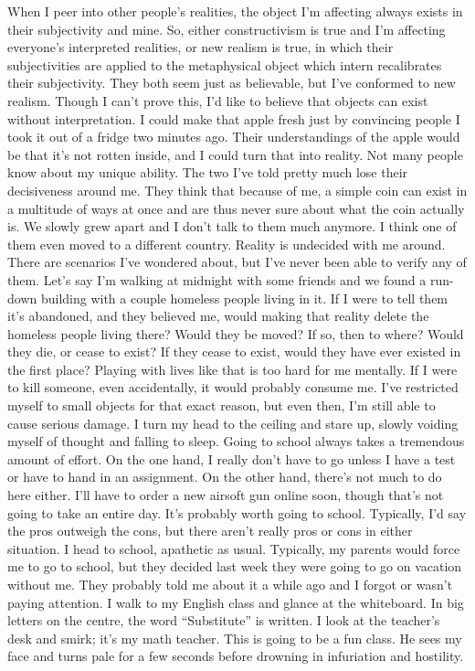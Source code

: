 \documentclass[a4paper, 12pt]{book}
\begin{document}
When I peer into other people’s realities, the object I’m affecting always exists in their subjectivity and mine. So, either constructivism is true and I’m affecting everyone’s interpreted realities, or new realism is true, in which their subjectivities are applied to the metaphysical object which intern recalibrates their subjectivity. They both seem just as believable, but I’ve conformed to new realism. Though I can’t prove this, I’d like to believe that objects can exist without interpretation. I could make that apple fresh just by convincing people I took it out of a fridge two minutes ago. Their understandings of the apple would be that it’s not rotten inside, and I could turn that into reality. Not many people know about my unique ability. The two I’ve told pretty much lose their decisiveness around me. They think that because of me, a simple coin can exist in a multitude of ways at once and are thus never sure about what the coin actually is. We slowly grew apart and I don’t talk to them much anymore. I think one of them even moved to a different country.
\newline
\tab
Reality is undecided with me around. There are scenarios I’ve wondered about, but I’ve never been able to verify any of them. Let’s say I’m walking at midnight with some friends and we found a run-down building with a couple homeless people living in it. If I were to tell them it’s abandoned, and they believed me, would making that reality delete the homeless people living there? Would they be moved? If so, then to where? Would they die, or cease to exist? If they cease to exist, would they have ever existed in the first place? Playing with lives like that is too hard for me mentally. If I were to kill someone, even accidentally, it would probably consume me. I’ve restricted myself to small objects for that exact reason, but even then, I’m still able to cause serious damage. I turn my head to the ceiling and stare up, slowly voiding myself of thought and falling to sleep. 
\newline
\tab
Going to school always takes a tremendous amount of effort. On the one hand, I really don’t have to go unless I have a test or have to hand in an assignment. On the other hand, there’s not much to do here either. I’ll have to order a new airsoft gun online soon, though that’s not going to take an entire day. It’s probably worth going to school. Typically, I’d say the pros outweigh the cons, but there aren’t really pros or cons in either situation.
\newline
\tab
I head to school, apathetic as usual. Typically, my parents would force me to go to school, but they decided last week they were going to go on vacation without me. They probably told me about it a while ago and I forgot or wasn’t paying attention. I walk to my English class and glance at the whiteboard. In big letters on the centre, the word ``Substitute'' is written. I look at the teacher’s desk and smirk; it’s my math teacher. This is going to be a fun class. He sees my face and turns pale for a few seconds before drowning in infuriation and hostility.
\end{document}

